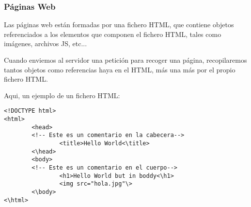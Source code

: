 \subsubsection{Páginas Web}
\noindent Las páginas web están formadas por una fichero HTML, que contiene objetos referenciados a los elementos que componen el fichero HTML, tales como imágenes, archivos JS, etc...
\par \noindent Cuando enviemos al servidor una petición para recoger una página, recopilaremos tantos objetos como referencias haya en el HTML, más una más por el propio fichero HTML.
\par \noindent Aqui, un ejemplo de un fichero HTML:
\begin{lstlisting}
<!DOCTYPE html>
<html>
        <head>
        <!-- Este es un comentario en la cabecera-->
                <title>Hello World<\title>
        <\head>
        <body>
        <!-- Este es un comentario en el cuerpo-->
                <h1>Hello World but in boddy<\h1>
                <img src="hola.jpg"\>
        <\body>
<\html>
\end{lstlisting}
